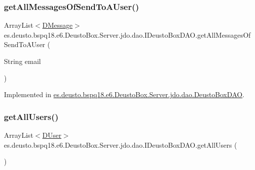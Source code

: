 \subsubsection{\texorpdfstring{get\+All\+Messages\+Of\+Send\+To\+A\+User()}{getAllMessagesOfSendToAUser()}}
{\footnotesize\ttfamily Array\+List$<$\mbox{\hyperlink{classes_1_1deusto_1_1bspq18_1_1e6_1_1_deusto_box_1_1_server_1_1jdo_1_1data_1_1_d_message}{D\+Message}}$>$ es.\+deusto.\+bspq18.\+e6.\+Deusto\+Box.\+Server.\+jdo.\+dao.\+I\+Deusto\+Box\+D\+A\+O.\+get\+All\+Messages\+Of\+Send\+To\+A\+User (\begin{DoxyParamCaption}\item[{String}]{email }\end{DoxyParamCaption})}



Implemented in \mbox{\hyperlink{classes_1_1deusto_1_1bspq18_1_1e6_1_1_deusto_box_1_1_server_1_1jdo_1_1dao_1_1_deusto_box_d_a_o_a5357c3fa65d1cb8e48114eee52358a9b}{es.\+deusto.\+bspq18.\+e6.\+Deusto\+Box.\+Server.\+jdo.\+dao.\+Deusto\+Box\+D\+AO}}.

\mbox{\label{interfacees_1_1deusto_1_1bspq18_1_1e6_1_1_deusto_box_1_1_server_1_1jdo_1_1dao_1_1_i_deusto_box_d_a_o_ae04e180df7666d21b8c09129c2f5e757}} 
\subsubsection{\texorpdfstring{get\+All\+Users()}{getAllUsers()}}
{\footnotesize\ttfamily Array\+List$<$\mbox{\hyperlink{classes_1_1deusto_1_1bspq18_1_1e6_1_1_deusto_box_1_1_server_1_1jdo_1_1data_1_1_d_user}{D\+User}}$>$ es.\+deusto.\+bspq18.\+e6.\+Deusto\+Box.\+Server.\+jdo.\+dao.\+I\+Deusto\+Box\+D\+A\+O.\+get\+All\+Users (\begin{DoxyParamCaption}{ }\end{DoxyParamCaption})}



